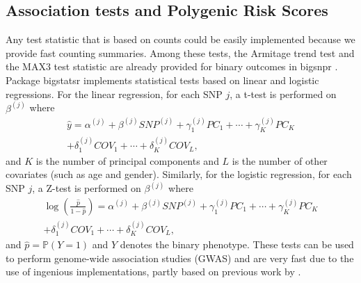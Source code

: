 \documentclass{bioinfo}
\begin{document}
\begin{methods}
\subsection{Association tests and Polygenic Risk Scores}

Any test statistic that is based on counts could be easily implemented because we provide fast counting summaries. Among these tests, the Armitage trend test and the MAX3 test statistic are already provided for binary outcomes in bigsnpr \cite[]{Zheng2012}. 
Package bigstatsr implements statistical tests based on linear and logistic regressions. For the linear regression, for each SNP $j$, a t-test is performed on $\beta^{(j)}$ where
\begin{multline}
  \hat{y} = \alpha^{(j)} + \beta^{(j)} SNP^{(j)} + \gamma_1^{(j)} PC_1 + \cdots + \gamma_K^{(j)} PC_K \\ + \delta_1^{(j)} COV_1 + \cdots + \delta_K^{(j)} COV_L,
\end{multline}
and $K$ is the number of principal components and $L$ is the number of other covariates (such as age and gender). Similarly, for the logistic regression, for each SNP $j$, a Z-test is performed on $\beta^{(j)}$ where
\begin{multline}
  \log{\left(\frac{\hat{p}}{1-\hat{p}}\right)} = \alpha^{(j)} + \beta^{(j)} SNP^{(j)} + \gamma_1^{(j)} PC_1 + \cdots + \gamma_K^{(j)} PC_K \\ + \delta_1^{(j)} COV_1 + \cdots + \delta_K^{(j)} COV_L,
\end{multline}
and $\hat{p} = \mathbb{P}(Y = 1)$ and $Y$ denotes the binary phenotype.
{\color{red}
These tests can be used to perform genome-wide association studies (GWAS) and are very fast due to the use of ingenious implementations, partly based on previous work by \cite{sikorska2013gwas}. 
}


\end{methods}
\end{document}
